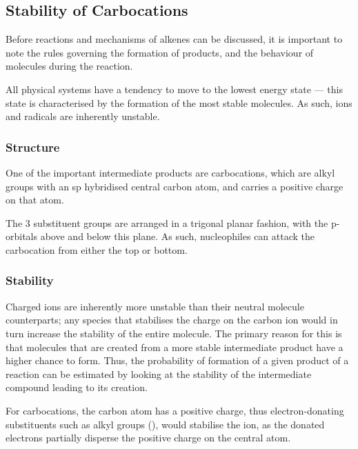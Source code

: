 \subsection{Stability of Carbocations}

	Before reactions and mechanisms of alkenes can be discussed, it is important to note the rules governing the formation
	of products, and the behaviour of molecules during the reaction.

	All physical systems have a tendency to move to the lowest energy state –– this state is characterised by the formation
	of the most stable molecules. As such, ions and radicals are inherently unstable.

	\subsubsection{Structure}

		One of the important intermediate products are carbocations, which are alkyl groups with an sp hybridised
		central carbon atom, and carries a positive charge on that atom.


		The 3 substituent groups are arranged in a trigonal planar fashion, with the p-orbitals above and below this
		plane. As such, nucleophiles can attack the carbocation from either the top or bottom.



	\subsubsection{Stability}

		Charged ions are inherently more unstable than their neutral molecule counterparts; any species that stabilises
		the charge on the carbon ion would in turn increase the stability of the entire molecule. The primary reason for
		this is that molecules that are created from a more stable intermediate product have a higher chance to form. Thus,
		the probability of formation of a given product of a reaction can be estimated by looking at the stability of
		the intermediate compound leading to its creation.

		For carbocations, the carbon atom has a positive charge, thus electron-donating substituents such as alkyl
		groups (), would stabilise the ion, as the donated electrons partially disperse the positive charge on the
		central atom.

